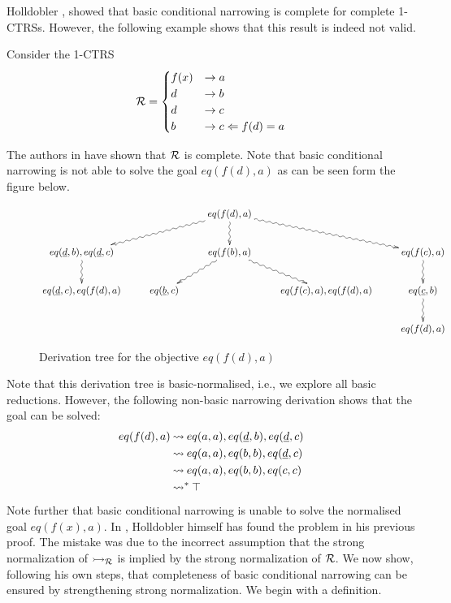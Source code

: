 Holldobler \cite{Holldobler:1989:FEL:76924}, showed that basic conditional narrowing is complete for complete 1-CTRSs. However, the following example shows that this result is indeed not valid.

\begin{example}
    Consider the 1-CTRS
    \begin{displaymath}
        \mathcal{R} =
        \begin{cases}
            f(x) & \rightarrow a                               \\
            d & \rightarrow b \\
            d & \rightarrow c\\
            b & \rightarrow c \Leftarrow f(d) = a
        \end{cases}
    \end{displaymath}
\end{example}

The authors in \cite{Middeldorp1994} have shown that $\mathcal{R}$ is complete. Note that basic conditional narrowing is not able to solve the goal $eq(f(d),a)$ as can be seen form the figure below.

\begin{figure}[!ht]
    \begin{displaymath}
        \xymatrix{
            & & eq(f(d),a) \ar@{~>}[dll] \ar@{~>}[drr] \ar@{~>}[d] &  & \\
            eq(\underline{d},b),eq(\underline{d},c) \ar@{~>}[d] & & eq(f(b),a) \ar@{~>}[dl] \ar@{~>}[dr] & & eq(f(c),a) \ar@{~>}[d] \\
            eq(\underline{d},c), eq(f(d),a) &  eq(\underline{b},c) &  & eq(f(c),a), eq(f(d),a) & eq(\underline{c},b) \ar@{~>}[d]\\
            & & & & eq(f(d),a)
        }
    \end{displaymath}
    \caption{Derivation tree for the objective $eq(f(d),a)$}
    \label{figure:counterexample-basic-conditional-narrowing}
\end{figure}
Note that this derivation tree is basic-normalised, i.e., we explore all basic reductions. However, the following non-basic narrowing derivation shows that the goal can be solved:
\begin{align*}
    eq(f(d),a) &\mathbin{\rightsquigarrow} eq(a,a), eq(\underline{d},b), eq(\underline{d},c) \\
    & \mathbin{\rightsquigarrow} eq(a,a), eq(b,b), eq(\underline{d},c) \\
    & \mathbin{\rightsquigarrow} eq(a,a), eq(b,b), eq(c,c) \\
    & \mathbin{\rightsquigarrow}^* \top
\end{align*}
Note further that basic conditional narrowing is unable to solve the normalised goal $eq(f(x),a)$. In \cite{Middeldorp1994}, Holldobler himself has found the problem in his previous proof. The mistake was due to the incorrect assumption that the strong normalization of $\rightarrowtail_{\mathcal{R}}$ is implied by the strong normalization of $\mathcal{R}$. We now show, following his own steps, that completeness of basic conditional narrowing can be ensured by strengthening strong normalization. We begin with a definition.

